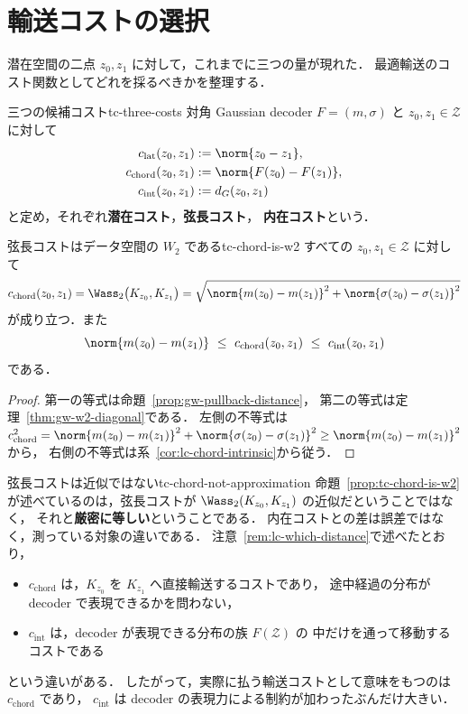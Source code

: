 \section{輸送コストの選択}
\label{sec:tc-cost-choice}

潜在空間の二点 $z_0,z_1$ に対して，これまでに三つの量が現れた．
最適輸送のコスト関数としてどれを採るべきかを整理する．

\begin{definition}{三つの候補コスト}{tc-three-costs}
  対角 Gaussian decoder $F=(m,\sigma)$ と $z_0,z_1\in\mathcal{Z}$ に対して
  \[
    \begin{aligned}
      c_{\mathrm{lat}}(z_0,z_1)&:=\norm{z_0-z_1},\\
      c_{\mathrm{chord}}(z_0,z_1)&:=\norm{F(z_0)-F(z_1)},\\
      c_{\mathrm{int}}(z_0,z_1)&:=d_G(z_0,z_1)
    \end{aligned}
  \]
  と定め，それぞれ\textbf{潜在コスト}，\textbf{弦長コスト}，
  \textbf{内在コスト}という．
\end{definition}

\begin{proposition}{弦長コストはデータ空間の $W_2$ である}{tc-chord-is-w2}
  すべての $z_0,z_1\in\mathcal{Z}$ に対して
  \[
    c_{\mathrm{chord}}(z_0,z_1)
    =\Wass_2\bigl(K_{z_0},K_{z_1}\bigr)
    =\sqrt{\norm{m(z_0)-m(z_1)}^2+\norm{\sigma(z_0)-\sigma(z_1)}^2}
  \]
  が成り立つ．また
  \[
    \norm{m(z_0)-m(z_1)}
    \ \leq\ c_{\mathrm{chord}}(z_0,z_1)
    \ \leq\ c_{\mathrm{int}}(z_0,z_1)
  \]
  である．
\end{proposition}

\begin{proof}
  第一の等式は命題~\ref{prop:gw-pullback-distance}，
  第二の等式は定理~\ref{thm:gw-w2-diagonal}である．
  左側の不等式は
  $c_{\mathrm{chord}}^2=\norm{m(z_0)-m(z_1)}^2+\norm{\sigma(z_0)-\sigma(z_1)}^2
  \geq\norm{m(z_0)-m(z_1)}^2$ から，
  右側の不等式は系~\ref{cor:lc-chord-intrinsic}から従う．
\end{proof}

\begin{remark}{弦長コストは近似ではない}{tc-chord-not-approximation}
  命題~\ref{prop:tc-chord-is-w2}が述べているのは，弦長コストが
  $\Wass_2(K_{z_0},K_{z_1})$ の近似だということではなく，
  それと\textbf{厳密に等しい}ということである．
  内在コストとの差は誤差ではなく，測っている対象の違いである．
  注意~\ref{rem:lc-which-distance}で述べたとおり，
  \begin{itemize}
    \item $c_{\mathrm{chord}}$ は，$K_{z_0}$ を $K_{z_1}$ へ直接輸送するコストであり，
      途中経過の分布が decoder で表現できるかを問わない，
    \item $c_{\mathrm{int}}$ は，decoder が表現できる分布の族 $F(\mathcal{Z})$ の
      中だけを通って移動するコストである
  \end{itemize}
  という違いがある．
  したがって，実際に払う輸送コストとして意味をもつのは $c_{\mathrm{chord}}$ であり，
  $c_{\mathrm{int}}$ は decoder の表現力による制約が加わったぶんだけ大きい．
\end{remark}

